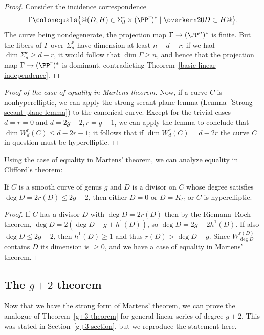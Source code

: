 \begin{proof}
Consider the incidence correspondence
$$
\Gamma \colonequals  \bigl\{@(D, H) \in \Sigma^r_d\times
(\PP^r)^*
\mid \overkern20 D \subset H@\bigr\}.
$$
The curve being nondegenerate, the projection map $\Gamma \to  (\PP^n)^*$
is finite. But the fibers of $\Gamma$ over $\Sigma^r_d$ have dimension
at least $n-d+r$; if we had $\dim \Sigma^r_d \geq d-r$, it would follow
that $\dim \Gamma \geq n$, and hence that the projection map $\Gamma
\to  (\PP^r)^*$ is dominant, contradicting Theorem~\ref{basic
linear independence}.
\end{proof}

\begin{proof}[Proof of the case of equality in Martens theorem]
 Now, if a curve $C$ is nonhyperelliptic, we can apply the
strong secant plane lemma
%
(Lemma~\ref{Strong secant plane lemma})
 to the
canonical curve.
%
Except for the trivial cases $d=r=0$
 and $d=2g-2, r=g-1$,
 we can apply
the lemma
to conclude that
 $\dim W^r_d(C) \leq d-2r-1$; it follows that if
$\dim W^r_d(C)
 = d-2r$ the curve $C$ in question must be hyperelliptic.
\unif
\end{proof}

Using the case of equality in Martens' theorem, we can analyze equality in
Clifford's theorem:
%

\begin{corollary}\label{equality in Clifford from Martens}
If $C$ is a smooth curve of genus $g$ and $D$
is
a divisor on $C$
whose degree satisfies $\deg D = 2r(D)\le 2g-2$,
then either $D =0$ or $D=K_C$ or $C$
is hyperelliptic.
\unif
\end{corollary}

\begin{proof}
If $C$ has a divisor $D$ with $\deg D =2 r(D)$ then by the Riemann--Roch
theorem,  $\deg D  = 2(\deg D-g+h^1(D))$,
so $\deg D = 2g-2h^1(D)$. If also $\deg D\leq 2g-2$, then $h^1(D) \geq 1$
and thus $r(D) >\deg D-g$. Since $W^{r(D)}_{\deg D}$ contains $D$
its dimension
is $\geq 0$, and we have a case of equality in Martens' theorem.
\end{proof}


\subsection*{The $g+2$ theorem}

Now that we have the strong form of Martens' theorem, we can prove the
analogue of Theorem~\ref{g+3 theorem} for general linear series of degree
$g+2$. This was stated in Section~\ref{g+3 section}, but
we
reproduce
the statement here.
%

